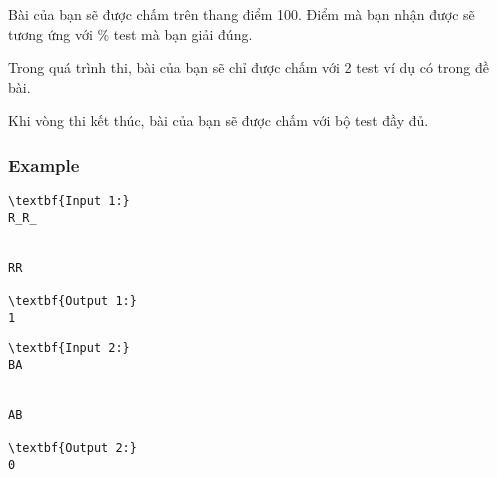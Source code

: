    Bài của bạn sẽ được chấm trên thang điểm 100. Điểm mà bạn nhận được sẽ tương ứng với \% test mà bạn giải đúng.  

   Trong quá trình thi, bài của bạn sẽ chỉ được chấm với 2 test ví dụ có trong đề bài.  

   Khi vòng thi kết thúc, bài của bạn sẽ được chấm với bộ test đầy đủ.  

\subsubsection{   Example  }
\begin{verbatim}
\textbf{Input 1:}
R_R_


RR

\textbf{Output 1:}
1
\end{verbatim}
\begin{verbatim}
\textbf{Input 2:}
BA


AB

\textbf{Output 2:}
0\end{verbatim}
